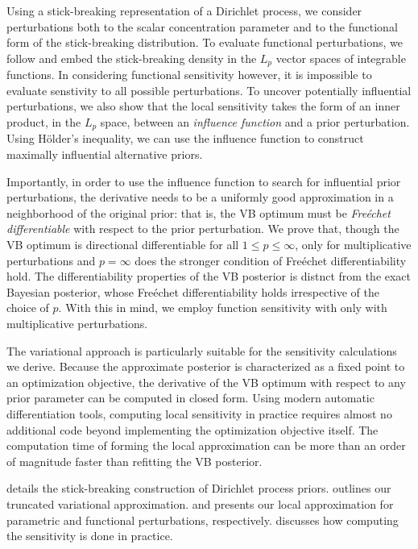 Using a stick-breaking representation of a Dirichlet process, we
consider perturbations both to the scalar concentration parameter and to the
functional form of the stick-breaking distribution.
To evaluate functional perturbations, we follow \cite{gustafson:1996:local}
and embed the
stick-breaking density in the $L_p$ vector spaces of integrable functions.
In considering functional sensitivity however, it is impossible to
evaluate senstivity to all possible perturbations.
To uncover potentially influential perturbations,
we also show that the local sensitivity takes the form of an inner product,
in the $L_p$ space, between an \textit{influence function}
and a prior perturbation.
Using H{\"o}lder's inequality,
we can use the influence function to construct maximally influential alternative
priors.

Importantly, in order to use the influence function to search for
influential prior perturbations, the derivative needs to be a
uniformly good approximation in
a neighborhood of the original prior: that is, the VB optimum must be
\textit{Fre{\'e}chet differentiable} with respect to the prior perturbation.
We prove that, though the VB optimum is directional differentiable for all
$1 \le p \le \infty$,  only for multiplicative perturbations and
$p=\infty$ does the stronger condition of Fre{\'e}chet differentiability hold.
The differentiability properties of the VB posterior is distnct from the
exact Bayesian posterior, whose Fre{\'e}chet differentiability
holds irrespective of the choice of $p$.
With this in mind, we employ function sensitivity with only with multiplicative
perturbations.

The variational approach is particularly suitable for the
sensitivity calculations we derive.
Because the approximate posterior is characterized as a fixed point to an optimization
objective, the derivative of the VB optimum with respect to any prior
parameter can be computed in closed form.
Using modern automatic differentiation tools, computing local sensitivity
in practice requires almost no additional code beyond
implementing the optimization objective itself.
The computation time of forming the local approximation can be
more than an order of magnitude faster than refitting the VB posterior.

 details the stick-breaking construction of Dirichlet process priors.
 outlines our truncated variational approximation.
 and  presents our
local approximation for parametric
and functional perturbations, respectively.
 discusses how computing the sensitivity is done in practice.

